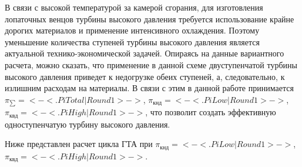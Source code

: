 В связи с высокой температурой за камерой сгорания, для изготовления лопаточных венцов турбины высокого давления требуется
использование крайне дорогих материалов и применение интенсивного охлаждения. Поэтому уменьшение количества ступеней
турбины высокого давления является актуальной технико-экономической задачей. Опираясь на данные вариантного расчета,
можно сказать, что применение в данной схеме двуступенчатой турбины высокого давления приведет к недогрузке
обеих ступеней, а, следовательно, к излишним расходам на материалы. В связи с этим в данной работе принимается
$\pi_{\sum} = <-<.PiTotal | Round1>->$, $\pi_{кнд} = <-<.PiLow | Round1>->$, $\pi_{квд} = <-<.PiHigh | Round1>->$,
что позволит создать эффективную одноступенчатую турбину высокого давления.

Ниже представлен расчет цикла ГТА при $\pi_{кнд} = <-<.PiLow | Round1>->$, $\pi_{квд} = <-<.PiHigh | Round1>->$.